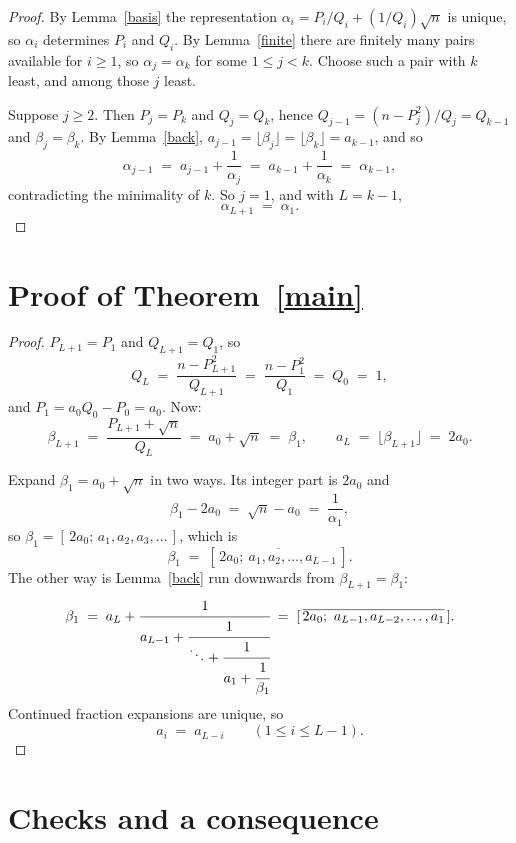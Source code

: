 \documentclass[12pt,a4paper]{article}
\theoremstyle{plain}
\theoremstyle{definition}
\begin{document}
\begin{proof}
By Lemma~\ref{basis} the representation $\alpha_i = P_i/Q_i + (1/Q_i)\sqrt n$
is unique, so $\alpha_i$ determines $P_i$ and $Q_i$. By Lemma~\ref{finite} there are finitely many pairs available
for $i \geq 1$, so $\alpha_j = \alpha_k$ for some $1 \leq j < k$. Choose such a
pair with $k$ least, and among those $j$ least.

Suppose $j \geq 2$. Then $P_j = P_k$ and $Q_j = Q_k$, hence
$Q_{j-1} = (n - P_j^2)/Q_j = Q_{k-1}$ and $\beta_j = \beta_k$. By
Lemma~\ref{back}, $a_{j-1} = \lfloor\beta_j\rfloor = \lfloor\beta_k\rfloor
= a_{k-1}$, and so
\[
  \alpha_{j-1} \;=\; a_{j-1} + \frac{1}{\alpha_j}
    \;=\; a_{k-1} + \frac{1}{\alpha_k}
    \;=\; \alpha_{k-1} ,
\]
contradicting the minimality of $k$. So $j = 1$, and with $L = k - 1$,
\[
  \alpha_{L+1} \;=\; \alpha_1 .
\]
\end{proof}

\section{Proof of Theorem~\ref{main}}

\begin{proof}
$P_{L+1} = P_1$ and $Q_{L+1} = Q_1$, so
\[
  Q_L \;=\; \frac{n - P_{L+1}^2}{Q_{L+1}}
    \;=\; \frac{n - P_1^2}{Q_1} \;=\; Q_0 \;=\; 1 ,
\]
and $P_1 = a_0Q_0 - P_0 = a_0$. Now:
\[
  \beta_{L+1} \;=\; \frac{P_{L+1} + \sqrt n}{Q_L} \;=\; a_0 + \sqrt n
    \;=\; \beta_1 ,
  \qquad
  a_L \;=\; \lfloor \beta_{L+1} \rfloor \;=\; 2a_0 .
\]

Expand $\beta_1 = a_0 + \sqrt n$ in two ways. Its integer part is $2a_0$ and
\[
  \beta_1 - 2a_0 \;=\; \sqrt n - a_0 \;=\; \frac{1}{\alpha_1} ,
\]
so $\beta_1 = [\,2a_0;\, a_1, a_2, a_3, \ldots\,]$, which is
\[
  \beta_1 \;=\; [\,\overline{2a_0;\ a_1, a_2, \ldots, a_{L-1}}\,] .
\]
The other way is Lemma~\ref{back} run downwards from $\beta_{L+1} = \beta_1$:
\[
  \beta_1 \;=\; a_L + \cfrac{1}{a_{L-1} + \cfrac{1}{\ddots
    + \cfrac{1}{a_1 + \cfrac{1}{\beta_1}}}}
  \;=\; [\,\overline{2a_0;\ a_{L-1}, a_{L-2}, \ldots, a_1}\,] .
\]
Continued fraction expansions are unique, so
\[
  a_i \;=\; a_{L-i} \qquad (1 \leq i \leq L-1) .
\]
\end{proof}

\section{Checks and a consequence}
\end{document}
